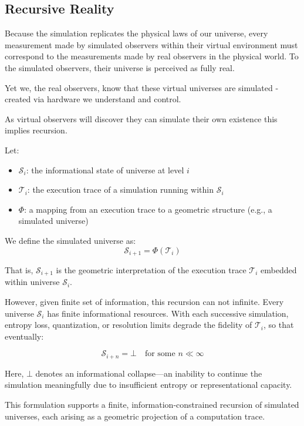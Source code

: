 \documentclass[11pt]{article}
\begin{document}
\subsection{Recursive Reality}

Because the simulation replicates the physical laws of our universe, every measurement made by simulated observers within their virtual environment must correspond to the measurements made by real observers in the physical world. To the simulated observers, their universe is perceived as fully real.

Yet we, the real observers, know that these virtual universes are simulated - created via hardware we understand and control.

As virtual observers will discover they can simulate their own existence \cite{bostrom2003} this implies recursion.

Let:

\begin{itemize}
  \item \( \mathcal{S}_i \): the informational state of universe at level \( i \)
  \item \( \mathcal{T}_i \): the execution trace of a simulation running within \( \mathcal{S}_i \)
  \item \( \Phi \): a mapping from an execution trace to a geometric structure (e.g., a simulated universe)
\end{itemize}

We define the simulated universe as:
\[
  \mathcal{S}_{i+1} = \Phi(\mathcal{T}_i)
\]

That is, \( \mathcal{S}_{i+1} \) is the geometric interpretation of the execution trace \( \mathcal{T}_i \) embedded within universe \( \mathcal{S}_i \).

However, given finite set of information, this recursion can not infinite. Every universe \( \mathcal{S}_i \) has finite informational resources. With each successive simulation, entropy loss, quantization, or resolution limits degrade the fidelity of \( \mathcal{T}_i \), so that eventually:

\[
  \mathcal{S}_{i+n} = \bot \quad \text{for some } n \ll \infty
\]

Here, \( \bot \) denotes an informational collapse—an inability to continue the simulation meaningfully due to insufficient entropy or representational capacity.

This formulation supports a finite, information-constrained recursion of simulated universes, each arising as a geometric projection of a computation trace.
\end{document}
